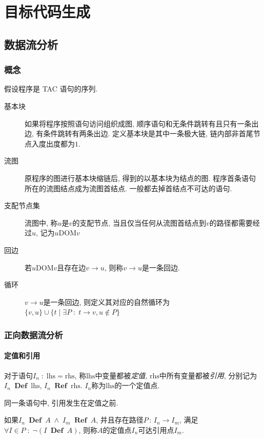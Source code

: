 \documentclass{ctexart}
\DeclareMathOperator{\Def}{\;\mathbf{Def}\;}
\DeclareMathOperator{\Ref}{\;\mathbf{Ref}\;}
\begin{document}
\section{目标代码生成}
\subsection{数据流分析}
\subsubsection{概念}
    假设程序是 TAC 语句的序列. 
    \begin{description}
        \item[基本块] 如果将程序按照语句访问组织成图,
            顺序语句和无条件跳转有且只有一条出边,
            有条件跳转有两条出边.
            定义基本块是其中一条极大链, 链内部非首尾节点入度出度都为$1$.
        \item[流图] 原程序的图进行基本块缩链后, 得到的以基本块为结点的图.
            程序首条语句所在的流图结点成为流图首结点.
            一般都去掉首结点不可达的语句.
        \item[支配节点集] 流图中, 称$u$是$v$的支配节点, 
            当且仅当任何从流图首结点到$v$的路径都需要经过$u$, 记为$u \mathrm{DOM} v$
        \item[回边] 若$u \mathrm{DOM} v$且存在边$v\to u$, 则称$v\to u$是一条回边.
        \item[循环] $v\to u$是一条回边,
            则定义其对应的自然循环为
            $ \{v, u\} \cup \{ t \;|\; \exists P\;:\; t\to v, u \not\in P\} $
    \end{description}

\subsubsection{正向数据流分析}
\paragraph{定值和引用} 
    对于语句$I_n \;:\; \mathrm{lhs} = \mathrm{rhs}$,
    称$\mathrm{lhs}$中变量都被\emph{定值},
    $\mathrm{rhs}$中所有变量都被\emph{引用},
    分别记为$I_n \Def \mathrm{lhs}$,
        $I_n \Ref \mathrm{rhs}$.
    $I_n$称为$\mathrm{lhs}$的一个定值点.\par
    同一条语句中, 引用发生在定值之前.\par
    如果$I_n \Def A \;\land\; I_m \Ref A$,
    并且存在路径$P\,:\,I_n\to I_m$,
    满足$\forall I\in P\;:\; \neg(I \Def A)$,
    则称$A$的定值点$I_n$可达引用点$I_m$.
\end{document}
